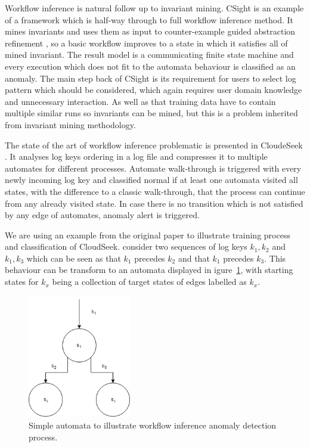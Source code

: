 Workflow inference is natural follow up to invariant mining. CSight \cite{beschastnikh2014inferring} is an example of a framework which is half-way through to full workflow inference method. It mines invariants and uses them as input to counter-example guided abstraction refinement \cite{clarke2000counterexample}, so a basic workflow improves to a state in which it satisfies all of mined invariant. The result model is a communicating finite state machine \cite{brand1983communicating} and every execution which does not fit to the automata behaviour is classified as an anomaly.
The main step back of CSight is its requirement for users to select log pattern which should be considered, which again requires user domain knowledge and unnecessary interaction. As well as that training data have to contain multiple similar runs so invariants can be mined, but this is a problem inherited from invariant mining methodology.

The state of the art of workflow inference problematic is presented in CloudeSeek  \cite{joshi2017cloudseer}. It analyses log keys ordering in a log file and compresses it to multiple automates for different processes. Automate walk-through is triggered with every newly incoming log key and classified normal if at least one automata visited all states, with the difference to a classic walk-through, that the process can continue from any already visited state. In case there is no transition which is not satisfied by any edge of automates, anomaly alert is triggered.

We are using an example from the original paper to illustrate training process and classification of CloudSeek.   consider two sequences of log keys $ k_{1}, k_{2}$ and $ k_{1}, k_{3} $ which can be seen as that $k_{1}$ precedes $k_{2}$ and that $k_{1}$ precedes $k_{3}$. This behaviour can be transform to an automata displayed in igure~\ref{fig:sota_workflowinference}, with starting states for $k_{x}$ being a collection of target states of edges labelled as $k_{x}$.

\begin{figure}[h]
    \centering
    \includegraphics[width=0.4\textwidth]{figures/stateOfTheArt/cloudSeek_simpl_automata.png}
    \caption{Simple automata to illustrate workflow inference anomaly detection process.}
    \label{fig:sota_workflowinference}
\end{figure}

